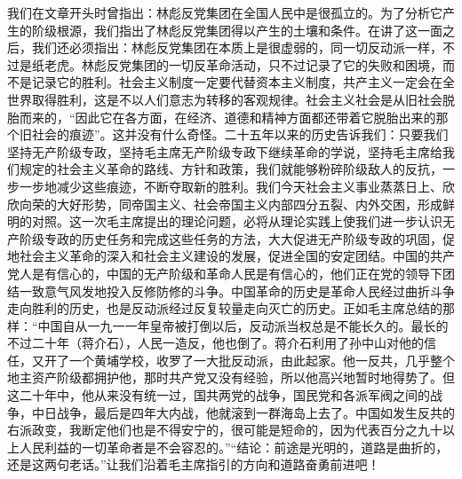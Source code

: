 \begin{maonote}
我们在文章开头时曾指出：林彪反党集团在全国人民中是很孤立的。为了分析它产生的阶级根源，我们指出了林彪反党集团得以产生的土壤和条件。在讲了这一面之后，我们还必须指出：林彪反党集团在本质上是很虚弱的，同一切反动派一样，不过是纸老虎。林彪反党集团的一切反革命活动，只不过记录了它的失败和困境，而不是记录它的胜利。社会主义制度一定要代替资本主义制度，共产主义一定会在全世界取得胜利，这是不以人们意志为转移的客观规律。社会主义社会是从旧社会脱胎而来的，“因此它在各方面，在经济、道德和精神方面都还带着它脱胎出来的那个旧社会的痕迹”。这并没有什么奇怪。二十五年以来的历史告诉我们：只要我们坚持无产阶级专政，坚持毛主席无产阶级专政下继续革命的学说，坚持毛主席给我们规定的社会主义革命的路线、方针和政策，我们就能够粉碎阶级敌人的反抗，一步一步地减少这些痕迹，不断夺取新的胜利。我们今天社会主义事业蒸蒸日上、欣欣向荣的大好形势，同帝国主义、社会帝国主义内部四分五裂、内外交困，形成鲜明的对照。这一次毛主席提出的理论问题，必将从理论实践上使我们进一步认识无产阶级专政的历史任务和完成这些任务的方法，大大促进无产阶级专政的巩固，促地社会主义革命的深入和社会主义建设的发展，促进全国的安定团结。中国的共产党人是有信心的，中国的无产阶级和革命人民是有信心的，他们正在党的领导下团结一致意气风发地投入反修防修的斗争。中国革命的历史是革命人民经过曲折斗争走向胜利的历史，也是反动派经过反复较量走向灭亡的历史。正如毛主席总结的那样：“中国自从一九一一年皇帝被打倒以后，反动派当权总是不能长久的。最长的不过二十年（蒋介石），人民一造反，他也倒了。蒋介石利用了孙中山对他的信任，又开了一个黄埔学校，收罗了一大批反动派，由此起家。他一反共，几乎整个地主资产阶级都拥护他，那时共产党又没有经验，所以他高兴地暂时地得势了。但这二十年中，他从来没有统一过，国共两党的战争，国民党和各派军阀之间的战争，中日战争，最后是四年大内战，他就滚到一群海岛上去了。中国如发生反共的右派政变，我断定他们也是不得安宁的，很可能是短命的，因为代表百分之九十以上人民利益的一切革命者是不会容忍的。”“结论：前途是光明的，道路是曲折的，还是这两句老话。”让我们沿着毛主席指引的方向和道路奋勇前进吧！
\end{maonote}
